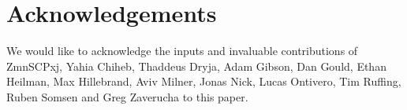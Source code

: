 \documentclass{article}
\begin{document}
\section{Acknowledgements}

We would like to acknowledge the inputs and invaluable contributions of ZmnSCPxj, Yahia Chiheb, Thaddeus Dryja, Adam Gibson, Dan Gould, Ethan Heilman, Max Hillebrand, Aviv Milner, Jonas Nick, Lucas Ontivero, Tim Ruffing, Ruben Somsen and Greg Zaverucha to this paper.

\printbibliography
\end{document}
